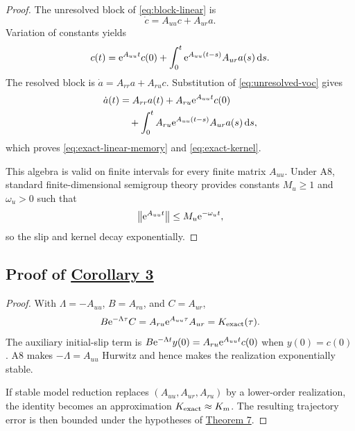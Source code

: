 \begin{proof}
The unresolved block of \eqref{eq:block-linear} is
\begin{equation}
 \dot c=A_{uu}c+A_{ur}a.
 \label{eq:unresolved-block}
\end{equation}
Variation of constants yields
\begin{equation}
 c(t)=\mathrm{e}^{A_{uu}t}c(0)+
 \int_0^t\mathrm{e}^{A_{uu}(t-s)}A_{ur}a(s)\,\mathrm{d} s.
 \label{eq:unresolved-voc}
\end{equation}
The resolved block is
$\dot a=A_{rr}a+A_{ru}c$. Substitution of
\eqref{eq:unresolved-voc} gives
\begin{align}
 \dot a(t)
 &=A_{rr}a(t)+A_{ru}\mathrm{e}^{A_{uu}t}c(0) \notag\\
 &\quad+
 \int_0^tA_{ru}\mathrm{e}^{A_{uu}(t-s)}A_{ur}a(s)\,\mathrm{d} s,
 \label{eq:linear-substitution}
\end{align}
which proves \eqref{eq:exact-linear-memory} and
\eqref{eq:exact-kernel}.

This algebra is valid on finite intervals for every finite matrix $A_{uu}$.
Under A8, standard finite-dimensional semigroup theory provides constants
$M_u\ge1$ and $\omega_u>0$ such that
\begin{equation}
 \left\lVert \mathrm{e}^{A_{uu}t}\right\rVert\le M_u\mathrm{e}^{-\omega_ut},
 \label{eq:hurwitz-semigroup}
\end{equation}
so the slip and kernel decay exponentially.
\end{proof}

\subsection{Proof of \hyperref[cor:exact-realization]{Corollary 3}}
\label{app:exact-realization}

\begin{proof}
With $\Lambda=-A_{uu}$, $B=A_{ru}$, and $C=A_{ur}$,
\begin{equation}
 B\mathrm{e}^{-\Lambda\tau}C
 =A_{ru}\mathrm{e}^{A_{uu}\tau}A_{ur}
 =K_{\rm exact}(\tau).
 \label{eq:realization-identity}
\end{equation}
The auxiliary initial-slip term is
$B\mathrm{e}^{-\Lambda t}y(0)=A_{ru}\mathrm{e}^{A_{uu}t}c(0)$ when $y(0)=c(0)$.
A8 makes $-\Lambda=A_{uu}$ Hurwitz and hence makes the realization
exponentially stable.

If stable model reduction replaces $(A_{uu},A_{ur},A_{ru})$ by a lower-order
realization, the identity becomes an approximation
$K_{\rm exact}\approx K_m$. The resulting trajectory error is then bounded
under the hypotheses of \hyperref[thm:kernel-error]{Theorem 7}.
\end{proof}

